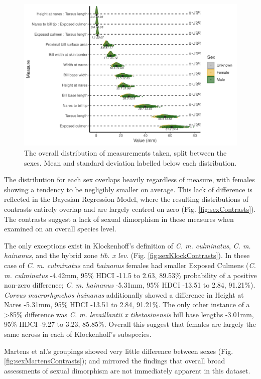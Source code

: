 \documentclass[10pt,a4paper]{article}
\begin{document}
\begin{figure}
\includegraphics[width=0.9\linewidth]{../Figures/OverallSummaryPlot} \caption{The overall distribution of measurements taken, split between the sexes. Mean and standard deviation labelled below each distribution.}\label{fig:overallPlot}
\end{figure}

The distribution for each sex overlaps heavily regardless of measure, with females showing a tendency to be negligibly smaller on average.
This lack of difference is reflected in the Bayesian Regression Model, where the resulting distributions of contrasts entirely overlap and are largely centred on zero (Fig. \ref{fig:sexContrasts}).
The contrasts suggest a lack of sexual dimorphism in these measures when examined on an overall species level.

The only exceptions exist in Klockenhoff's definition of \emph{C. m. culminatus}, \emph{C. m. hainanus}, and the hybrid zone \emph{tib. x lev.} (Fig. \ref{fig:sexKlockContrasts}).
In these case of \emph{C. m. culminatus} and \emph{hainanus} females had smaller Exposed Culmens (\emph{C. m. culminatus} -4.42mm, 95\% HDCI -11.5 to 2.63, 89.53\% probability of a positive non-zero difference; \emph{C. m. hainanus} -5.31mm, 95\% HDCI -13.51 to 2.84, 91.21\%).
\emph{Corvus macrorhynchos hainanus} additionally showed a difference in Height at Nares -5.31mm, 95\% HDCI -13.51 to 2.84, 91.21\%.
The only other instance of a \textgreater85\% difference was \emph{C. m. levaillantii x tibetosinensis} bill base lengths -3.01mm, 95\% HDCI -9.27 to 3.23, 85.85\%.
Overall this suggest that females are largely the same across in each of Klockenhoff's subspecies.

Martens et al.'s groupings showed very little difference between sexes (Fig. \ref{fig:sexMartensContrasts}); and mirrored the findings that overall broad assessments of sexual dimorphism are not immediately apparent in this dataset.
\end{document}
